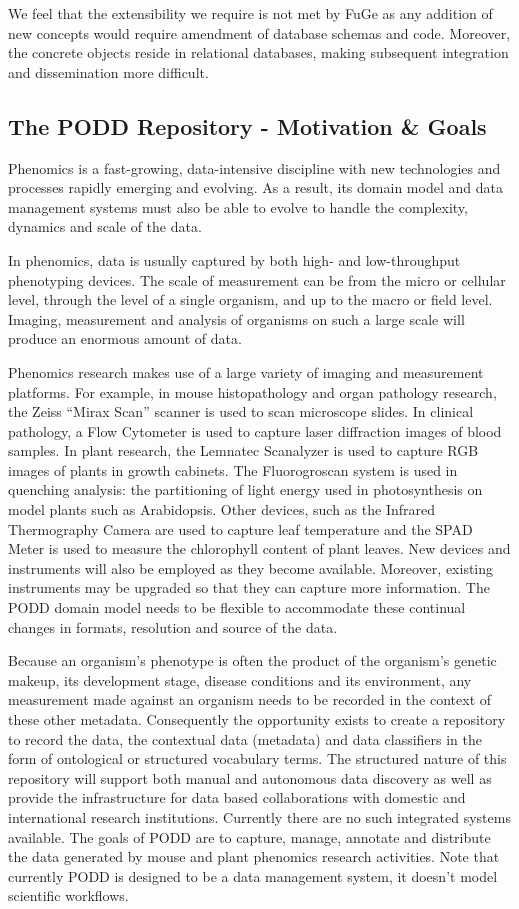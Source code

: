 \documentclass[conference,10pt]{IEEEtran}
\begin{document}
We feel that the extensibility we require is not met by FuGe as any addition of new concepts would require amendment of database schemas and code. Moreover, the concrete objects reside in relational databases, making subsequent integration and dissemination more difficult.

\vspace{-8pt}
\subsection{The PODD Repository - Motivation \& Goals}
Phenomics is a fast-growing, data-intensive discipline with new technologies and processes rapidly emerging and evolving. As a result, its domain model and data management systems must also be able to evolve to handle the complexity, dynamics and scale of the data.

In phenomics, data is usually captured by both high- and low-throughput phenotyping devices. The scale of measurement can be from the micro or cellular level, through the level of a single organism, and up to the macro or field level. Imaging, measurement and analysis of organisms on such a large scale will produce an enormous amount of data. 

Phenomics research makes use of a large variety of imaging and measurement platforms. For example, in mouse histopathology and organ pathology research, the Zeiss ``Mirax Scan'' scanner is used to scan microscope slides. In clinical pathology, a Flow Cytometer is used to capture laser diffraction images of blood samples. In plant research, the Lemnatec Scanalyzer is used to capture RGB images of plants in growth cabinets. The Fluorogroscan system is used in quenching analysis: the partitioning of light energy used in photosynthesis on model plants such as Arabidopsis. Other devices, such as the Infrared Thermography Camera are used to capture leaf temperature and the SPAD Meter is used to measure the chlorophyll content of plant leaves. New devices and instruments will also be employed as they become available. Moreover, existing instruments may be upgraded so that they can capture more information. The PODD domain model needs to be flexible to accommodate these continual changes in formats, resolution and source of the data. 

Because an organism's phenotype is often the product of the organism's genetic makeup, its development stage, disease conditions and its environment, any measurement made against an organism needs to be recorded in the context of these other metadata. Consequently the opportunity exists to create a repository to record the data, the contextual data (metadata) and data classifiers in the form of ontological or structured vocabulary terms. The structured nature of this repository will support both manual and autonomous data discovery as well as provide the infrastructure for data based collaborations with domestic and international research institutions. Currently there are no such integrated systems available. The goals of PODD are to capture, manage, annotate and distribute the data generated by mouse and plant phenomics research activities. Note that currently PODD is designed to be a data management system, it doesn't model scientific workflows.
\end{document}
